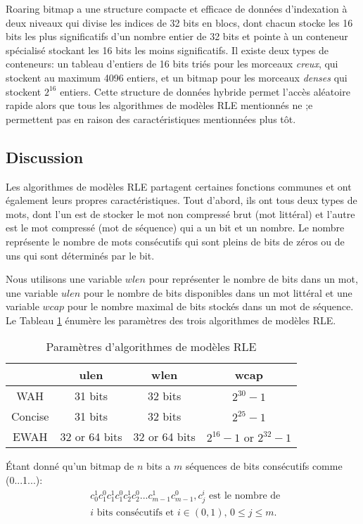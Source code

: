 Roaring bitmap a une structure compacte et efficace de données d'indexation à deux niveaux qui divise les indices de 32 bits en blocs, dont chacun stocke les 16 bits les plus significatifs d'un nombre entier de 32 bits et pointe à un conteneur spécialisé stockant les 16 bits les moins significatifs. Il existe deux types de conteneurs: un tableau d'entiers de 16 bits triés pour les morceaux \emph{creux}, qui stockent au maximum 4096 entiers, et un bitmap pour les morceaux \emph{denses} qui stockent $2^{16}$ entiers. Cette structure de données hybride permet l'accès aléatoire rapide alors que tous les algorithmes de modèles RLE mentionnés ne ;e permettent pas en raison des caractéristiques mentionnées plus tôt.

\subsection{Discussion}

Les algorithmes de modèles RLE partagent certaines fonctions communes et ont également leurs propres caractéristiques. Tout d'abord, ils ont tous deux types de mots, dont l'un est de stocker le mot non compressé brut (mot littéral) et l'autre est le mot compressé (mot de séquence) qui a un bit et un nombre. Le nombre représente le nombre de mots consécutifs qui sont pleins de bits de zéros ou de uns qui sont déterminés par le bit.

Nous utilisons une variable $wlen$ pour représenter le nombre de bits dans un mot, une variable $ulen$ pour le nombre de bits disponibles dans un mot littéral et une variable $wcap$ pour le nombre maximal de bits stockés dans un mot de séquence. Le Tableau \ref{tbl:bm:bmparms} énumère les paramètres des trois algorithmes de modèles RLE.

\begin{table}[h]
\centering
\begin{tabular}{|c|c|c|c|}
\hline
& ulen & wlen & wcap \\
\hline
WAH & 31 bits & 32 bits & $2^{30} - 1$ \\
\hline
Concise & 31 bits & 32 bits & $2^{25} - 1$ \\
\hline
EWAH & 32 or 64 bits & 32 or 64 bits & $2^{16} - 1 \text{ or } 2^{32} - 1$ \\
\hline
\end{tabular}
\caption{Paramètres d'algorithmes de modèles RLE}
\label{tbl:bm:bmparms}
\end{table}

Étant donné qu'un bitmap de $n$ bits a $m$ séquences de bits consécutifs comme (0...1...):
\begin{align*}
& c^1_0c^0_1c^1_1c^0_1c^1_2c^0_2...c^1_{m - 1}c^0_{m - 1}, c^i_j \text{ est le nombre de } \\
& i \text{ bits consécutifs et } i \in (0, 1),\, 0 \leq j \leq m.  
\end{align*}

